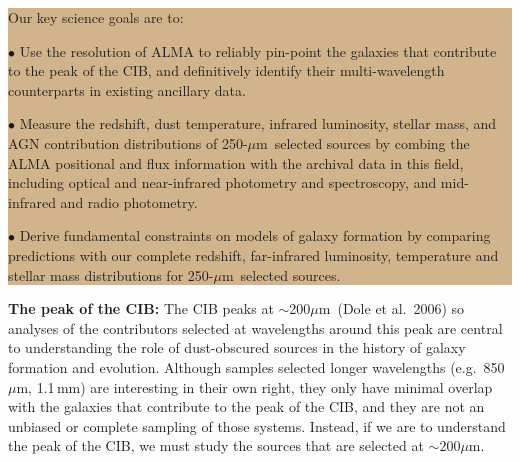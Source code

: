 \documentclass[11pt,a4paper]{article}
\newcommand{\herschel}{{\it Herschel}}
\newcommand{\ea}{et~al.}
\newcommand{\micron}{$\mu$m}
\begin{document}
\indent\indent\colorbox{tan}{
\begin{minipage}{16cm}
\noindent Our key science goals are to:

$\bullet$ Use the resolution of ALMA to reliably pin-point the galaxies
that contribute to the peak of the CIB, and definitively identify
their multi-wavelength counterparts in existing ancillary data.


$\bullet$ Measure the redshift, dust temperature, infrared luminosity,
stellar mass, and AGN contribution distributions of 250-\micron\
selected sources by combing the ALMA positional and flux information
with the archival data in this field, including optical and
near-infrared photometry and spectroscopy, and mid-infrared and radio
photometry.

$\bullet$ Derive fundamental constraints on models of galaxy formation
by comparing predictions with our complete redshift, far-infrared
luminosity, temperature and stellar mass distributions for
250-\micron\ selected sources.

\end{minipage}}


\vspace{0.3cm}
{\bf The peak of the CIB: }
%
The CIB peaks at $\sim$200\micron\ (Dole et al.\ 2006) so analyses of
the contributors selected at wavelengths around this peak are
central to understanding the role of dust-obscured sources in the
history of galaxy formation and evolution. 
Although samples selected longer wavelengths (e.g.\ 850\,\micron,
1.1\,mm) are interesting in their own right, they only have minimal overlap 
with the galaxies that contribute to the peak of the CIB, and they are not an unbiased or complete
sampling of those systems. Instead, if we are to understand the peak of
the CIB, we must study the sources that are selected at $\sim200$\micron.
\end{document}

